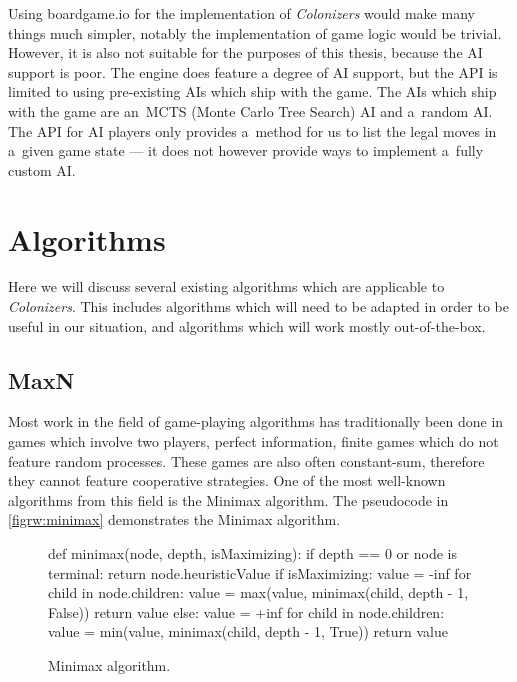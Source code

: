 Using boardgame.io for the implementation of \emph{Colonizers} would make many things
much simpler, notably the implementation of game logic would be trivial.
However, it is also not suitable for the purposes of this thesis, because the AI
support is poor. The engine does feature a degree of AI support, but the API
is limited to using pre-existing AIs which ship with the game. The AIs which
ship with the game are an~MCTS (Monte Carlo Tree Search) AI and
a~random AI. The API for AI players only provides a~method for us to list the legal moves in
a~given game state --- it does not however provide ways to implement a~fully
custom AI.

\clearpage
\section{Algorithms}

Here we will discuss several existing algorithms which are applicable to \emph{Colonizers}.
This includes algorithms which will need to be adapted in order to be useful in our
situation, and algorithms which will work mostly out-of-the-box.

\subsection{MaxN}

Most work in the field of game-playing algorithms has traditionally been done
in games which involve two players, perfect information, finite games which
do not feature random processes. These games are also often constant-sum, therefore
they cannot feature cooperative strategies. One of the most well-known
algorithms from this field is the Minimax algorithm. The pseudocode
in \autoref{figrw:minimax} demonstrates the Minimax algorithm.

\begin{figure}[h!]
\begin{code}
def minimax(node, depth, isMaximizing):
    if depth == 0 or node is terminal:
        return node.heuristicValue
    if isMaximizing:
        value = -inf
        for child in node.children:
            value = max(value, minimax(child, depth - 1, False))
        return value
    else:
        value = +inf
        for child in node.children:
            value = min(value, minimax(child, depth - 1, True))
        return value
\end{code}
\caption{Minimax algorithm.}\label{figrw:minimax}
\end{figure}

